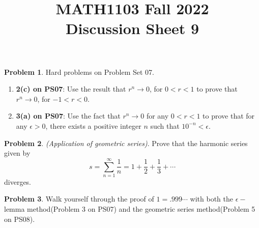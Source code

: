\documentclass[11pt,oneside]{amsart}
\title{MATH1103 Fall 2022\\
Discussion Sheet 9}
\theoremstyle{definition}
\newtheorem{problem}{Problem}
\begin{document}
    \maketitle
 
    \begin{problem} Hard problems on Problem Set 07.
    \begin{enumerate}
        \item \textbf{2(c) on PS07}: Use the result that $r^n \to 0$, for $0<r<1$ to prove that $r^n \to 0$, for $-1<r<0$.
        \vfill
        \item \textbf{3(a) on PS07}: Use the fact that $r^n \to 0$ for any $0<r<1$ to prove that for any $\epsilon>0$, there exists a positive integer $n$ such that $10^{-n}<\epsilon$.
        \vfill
        \end{enumerate}
    \end{problem}
\newpage

    \begin{problem}
    \textit{(Application of geometric series)}. Prove that the harmonic series given by
    $$
    s=\sum\limits_{n=1}^\infty \frac{1}{n}=1+\frac{1}{2}+\frac{1}{3}+\cdots
    $$
    diverges.
    \vfill
    \end{problem}
    
    \begin{problem}
    Walk yourself through the proof of $1=.999\cdots$ with both the $\epsilon-$lemma method(Problem 3 on PS07) and the geometric series method(Problem 5 on PS08).
    \end{problem}
\end{document}
